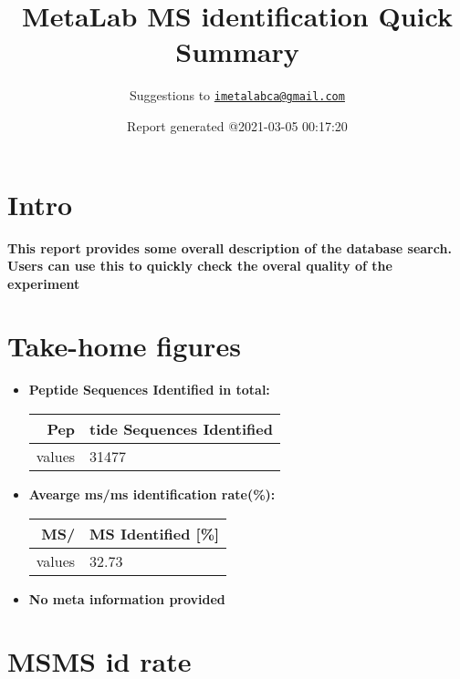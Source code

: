\documentclass[
]{article}
\title{MetaLab MS identification Quick Summary}
\author{Suggestions to
\href{mailto:imetalabca@gmail.com}{\nolinkurl{imetalabca@gmail.com}}}
\date{Report generated @2021-03-05 00:17:20}
\providecommand{\tightlist}{%
  \setlength{\itemsep}{0pt}\setlength{\parskip}{0pt}}
\begin{document}
\maketitle

{
\setcounter{tocdepth}{4}
\tableofcontents
}
\hypertarget{intro}{%
\section{Intro}\label{intro}}

\textbf{This report provides some overall description of the database
search. } \textbf{Users can use this to quickly check the overal quality
of the experiment}

\hypertarget{take-home-figures}{%
\section{Take-home figures}\label{take-home-figures}}

\begin{itemize}
\tightlist
\item
  \textbf{Peptide Sequences Identified in total: }

  \begin{longtable}[]{@{}rl@{}}
  \toprule
  Pep & tide Sequences Identified\tabularnewline
  \midrule
  \endhead
  values & 31477\tabularnewline
  \bottomrule
  \end{longtable}
\end{itemize}

\begin{itemize}
\tightlist
\item
  \textbf{Avearge ms/ms identification rate(\%): }

  \begin{longtable}[]{@{}rl@{}}
  \toprule
  MS/ & MS Identified {[}\%{]}\tabularnewline
  \midrule
  \endhead
  values & 32.73\tabularnewline
  \bottomrule
  \end{longtable}
\end{itemize}

\begin{itemize}
\tightlist
\item
  \textbf{No meta information provided}
\end{itemize}

\hypertarget{msms-id-rate}{%
\section{MSMS id rate}\label{msms-id-rate}}
\end{document}
